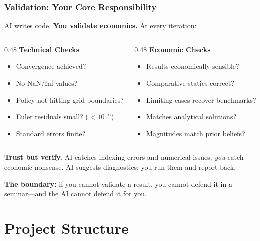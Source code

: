 \documentclass[10pt,english,aspectratio=169]{beamer}
\begin{document}
\begin{frame}
\frametitle{Validation: Your Core Responsibility}

AI writes code. \textbf{You validate economics.} At every iteration:

\vspace{0.2cm}

\begin{columns}
\begin{column}{0.48\textwidth}
\textbf{Technical Checks}
\begin{itemize}
    \item Convergence achieved?
    \item No NaN/Inf values?
    \item Policy not hitting grid boundaries?
    \item Euler residuals small? ($<10^{-6}$)
    \item Standard errors finite?
\end{itemize}
\end{column}
\begin{column}{0.48\textwidth}
\textbf{Economic Checks}
\begin{itemize}
    \item Results economically sensible?
    \item Comparative statics correct?
    \item Limiting cases recover benchmarks?
    \item Matches analytical solutions?
    \item Magnitudes match prior beliefs?
\end{itemize}
\end{column}
\end{columns}

\vspace{0.4cm}

\textbf{Trust but verify.} AI catches indexing errors and numerical issues; \textit{you} catch economic nonsense. AI suggests diagnostics; you run them and report back.

\vspace{0.1cm}

\textbf{The boundary:} if you cannot validate a result, you cannot defend it in a seminar---and the AI cannot defend it for you.
\end{frame}

\section{Project Structure}
\end{document}

